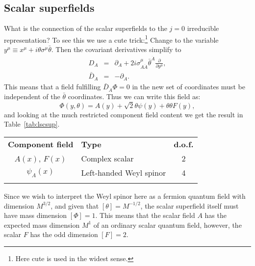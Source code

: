 \documentclass[notes.tex]{subfiles}
\begin{document}

\subsection{Scalar superfields}
What is the connection of the scalar superfields to the $j=0$ irreducible representation? To see this we use a cute trick:\footnote{Here cute is used in the widest sense.} Change to the variable $y^\mu \equiv x^\mu + i\theta\sigma^\mu \bar{\theta}$. Then the covariant derivatives simplify to
\begin{eqnarray}
D_A &=& \partial_A + 2i\sigma^\mu_{A\dot{A}}\bar{\theta}^{\dot{A}}\frac{\partial}{\partial y^\mu},\\
\bar{D}_{\dot{A}} &=& -\partial_{\dot{A}}.
\end{eqnarray}
This means that a field fulfilling $\bar{D}_{\dot{A}} \Phi = 0$ in the new set of coordinates must be independent of the $\bar{\theta}$ coordinates. Thus we can write this field as:
\begin{equation}
\Phi(y, \theta) = A(y) + \sqrt{2}\theta\psi(y) + \theta\theta F(y),
\label{eq:leftscalarsuperfield_y}
\end{equation}
and looking at the much restricted component field content we get the result in Table~\ref{tab:lscsup}.
\begin{center}
   \begin{tabular}{c |l| c} 
   \noalign{\smallskip}\hline\noalign{\smallskip}
   {\bf Component field} & {\bf Type} & {\bf d.o.f.} \\
   \noalign{\smallskip}\hline\noalign{\smallskip}
   $A(x)$, $F(x)$ & Complex scalar & 2\\
   $\psi_A(x)$ & Left-handed Weyl spinor & 4\\
   \noalign{\smallskip}\hline\noalign{\smallskip}
    \end{tabular}
   \end{center}

Since we wish to interpret the Weyl spinor here as a fermion quantum field with dimension $M^{3/2}$, and given that $[\theta]=M^{-1/2}$, the scalar superfield itself must have mass dimension $[\Phi]=1$. This means that the scalar field $A$ has the expected mass dimension $M^1$ of an ordinary scalar quantum field, however, the scalar $F$ has the odd dimension $[F]=2$.
\end{document}
